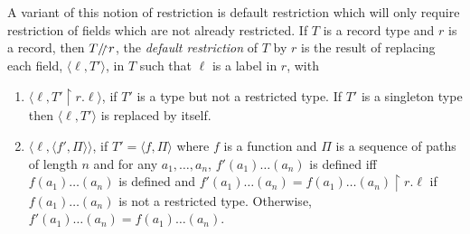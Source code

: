 A variant of this notion of restriction is default restriction
which will only require restriction of fields which are not already
restricted. If $T$ is a record type and $r$ is a record, then
$T\drestr r$, the
\textit{default restriction} of $T$ by
$r$ is the result
of replacing each field, $\langle \ell, T'\rangle$, in $T$ such that
$\ell$ is a label in $r$, with 
\begin{enumerate}
\item  $\langle\ell,T'\!\restriction\!r.\ell\rangle$, if
$T'$ is a type but not a restricted type. If $T'$ is a
singleton type then $\langle \ell, T'\rangle$ is replaced by itself.
\item $\langle\ell,\langle f',\Pi\rangle\rangle$, if $T'=\langle
  f,\Pi\rangle$ where $f$ is a function and $\Pi$ is a sequence of
  paths of length $n$ and for any
  $a_1,\ldots,a_n$, $f'(a_1)\ldots(a_n)$ is defined iff
  $f(a_1)\ldots(a_n)$ is defined and $f'(a_1)\ldots(a_n) =
  f(a_1)\ldots(a_n)\!\restriction\!r.\ell$ if $f(a_1)\ldots(a_n)$ is not a
  restricted type. Otherwise, $f'(a_1)\ldots(a_n) =
  f(a_1)\ldots(a_n)$.
\end{enumerate}  



